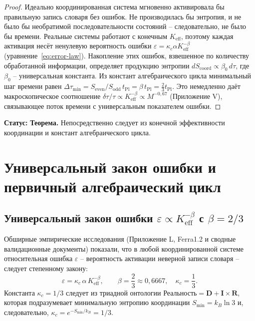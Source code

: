 \documentclass[12pt,a4paper]{article}
\begin{document}
	\begin{proof}
		Идеально координированная система мгновенно активировала бы правильную запись словаря без ошибок. Не производилась бы энтропия, и не было бы необратимой последовательности состояний – следовательно, не было бы времени. Реальные системы работают с конечным \(K_{\mathrm{eff}}\), поэтому каждая активация несёт ненулевую вероятность ошибки \(\varepsilon = \kappa_c \alpha K_{\mathrm{eff}}^{-\beta}\) (уравнение~\ref{eq:error-law}). Накопление этих ошибок, взвешенное по количеству обработанной информации, определяет продукцию энтропии \(dS_{\mathrm{coord}} \propto \beta_0 \, d\tau\), где \(\beta_0\) – универсальная константа. Из констант алгебраического цикла минимальный шаг времени равен \(\Delta \tau_{\min} = S_{\mathrm{even}}/S_{\mathrm{odd}} \, t_{\mathrm{Pl}} = \beta \, t_{\mathrm{Pl}} = \frac{2}{3} t_{\mathrm{Pl}}\). Это немедленно даёт макроскопическое соотношение \(\delta\tau/\tau \propto K_{\mathrm{eff}}^{-\beta} \propto M^{-0,67}\) (Приложение V), связывающее поток времени с универсальным показателем ошибки.
	\end{proof}
	
	\textbf{Статус:} \textbf{Теорема.} Непосредственно следует из конечной эффективности координации и констант алгебраического цикла.
	
	\section{Универсальный закон ошибки и первичный алгебраический цикл}
	\label{sec:error-law}
	
	\subsection{Универсальный закон ошибки \(\varepsilon \propto K_{\mathrm{eff}}^{-\beta}\) с \(\beta = 2/3\)}
	
	Обширные эмпирические исследования (Приложение L, Ferra1.2 и сводные валидационные документы) показали, что в любой координированной системе относительная ошибка \(\varepsilon\) – вероятность активации неверной записи словаря – следует степенному закону:
	\begin{equation}
		\boxed{\varepsilon = \kappa_c \, \alpha \, K_{\mathrm{eff}}^{-\beta}, \qquad \beta = \frac{2}{3} \approx 0,6667,\quad \kappa_c = \frac{1}{3}}.
		\label{eq:error-law}
	\end{equation}
	Константа \(\kappa_c = 1/3\) следует из триадной онтологии \(\text{Реальность} = \mathbf{D} + \mathbf{I} \times \mathbf{R}\), которая подразумевает минимальную энтропию координации \(S_{\min} = k_B \ln 3\) и, следовательно, \(\kappa_c = e^{-S_{\min}/k_B} = 1/3\).
	
\end{document}
